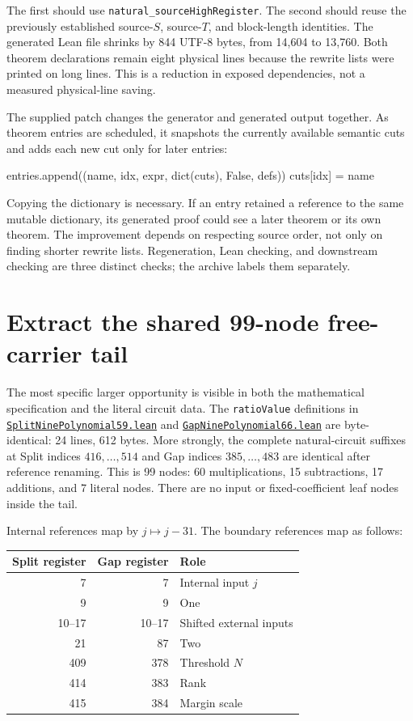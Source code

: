 \documentclass[11pt,letterpaper]{article}
\newcommand{\code}[1]{\nolinkurl{#1}}
\newcommand{\src}[2]{\href{https://github.com/VladimirReshetnikov/ProveIt/blob/60e9c5d620c6c387d932876cfa2d9376f64ea56c/Computability/DiophantineConsistency/Lean/DiophantineConsistency/#1.lean}{\code{#1.lean}}#2}
\begin{document}
The first should use \code{natural_sourceHighRegister}. The second should
reuse the previously established source-$S$, source-$T$, and block-length
identities. The generated Lean file shrinks by 844 UTF-8 bytes, from 14,604
to 13,760. Both theorem declarations remain eight physical lines because the
rewrite lists were printed on long lines. This is a reduction in exposed
dependencies, not a measured physical-line saving.

The supplied patch changes the generator and generated output together.
As theorem entries are scheduled, it snapshots the currently available
semantic cuts and adds each new cut only for later entries:

\begin{Lean}
entries.append((name, idx, expr, dict(cuts), False, defs))
cuts[idx] = name
\end{Lean}

Copying the dictionary is necessary. If an entry retained a reference to the
same mutable dictionary, its generated proof could see a later theorem or
its own theorem. The improvement depends on respecting source order, not only
on finding shorter rewrite lists. Regeneration, Lean checking, and downstream
checking are three distinct checks; the archive labels them separately.

\section{Extract the shared 99-node free-carrier tail}
\label{sec:tail}

The most specific larger opportunity is visible in both the mathematical
specification and the literal circuit data. The \code{ratioValue} definitions
in \src{SplitNinePolynomial59}{ and }
\src{GapNinePolynomial66}{ are byte-identical: 24 lines, 612 bytes.}
More strongly, the complete natural-circuit suffixes at Split indices
$416,\ldots,514$ and Gap indices $385,\ldots,483$ are identical after reference
renaming. This is 99 nodes: 60 multiplications, 15 subtractions, 17 additions,
and 7 literal nodes. There are no input or fixed-coefficient leaf nodes inside
the tail.

Internal references map by $j\mapsto j-31$. The boundary references map as
follows:

\begin{center}
\begin{tabular}{rrl}
\toprule
Split register & Gap register & Role\\
\midrule
7 & 7 & Internal input $j$\\
9 & 9 & One\\
10--17 & 10--17 & Shifted external inputs\\
21 & 87 & Two\\
409 & 378 & Threshold $N$\\
414 & 383 & Rank\\
415 & 384 & Margin scale\\
\bottomrule
\end{tabular}
\end{center}
\end{document}
